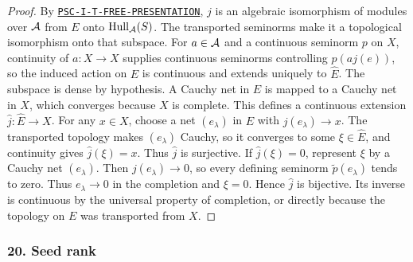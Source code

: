 \begin{proof}
By \hyperref[rec:PSC-I-T-FREE-PRESENTATION]{\nolinkurl{PSC-I-T-FREE-PRESENTATION}}, $j$ is an algebraic isomorphism of modules over $\mathcal A$ from $E$ onto $\operatorname{Hull}_{\mathcal A}(S)$.  The transported seminorms make it a topological isomorphism onto that subspace.  For $a\in\mathcal A$ and a continuous seminorm $p$ on $X$, continuity of $a:X\to X$ supplies continuous seminorms controlling $p(aj(e))$, so the induced action on $E$ is continuous and extends uniquely to $\widehat E$.  The subspace is dense by hypothesis.  A Cauchy net in $E$ is mapped to a Cauchy net in $X$, which converges because $X$ is complete.  This defines a continuous extension $\widehat j:\widehat E\to X$.  For any $x\in X$, choose a net $(e_\lambda)$ in $E$ with $j(e_\lambda)\to x$.  The transported topology makes $(e_\lambda)$ Cauchy, so it converges to some $\xi\in\widehat E$, and continuity gives $\widehat j(\xi)=x$.  Thus $\widehat j$ is surjective.  If $\widehat j(\xi)=0$, represent $\xi$ by a Cauchy net $(e_\lambda)$.  Then $j(e_\lambda)\to0$, so every defining seminorm $\widetilde p(e_\lambda)$ tends to zero.  Thus $e_\lambda\to0$ in the completion and $\xi=0$.  Hence $\widehat j$ is bijective.  Its inverse is continuous by the universal property of completion, or directly because the topology on $E$ was transported from $X$.
\end{proof}
\subsubsection*{20. Seed rank}
